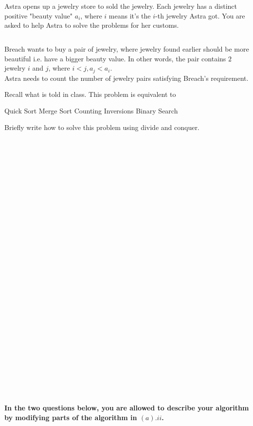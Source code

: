 
Astra opens up a jewelry store to sold the jewelry. Each jewelry has a distinct positive "beauty value" $a_i$, where $i$ means it's the $i$-th jewelry Astra got. You are asked to help Astra to solve the problems for her customs.

\begin{parts}
\part{} 

Breach wants to buy a pair of jewelry, where jewelry found earlier should be more beautiful i.e. have a bigger beauty value. In other words, the pair contains $2$ jewelry $i$ and $j$, where $i<j,a_j<a_i$. \\
Astra needs to count the number of jewelry pairs satisfying Breach's requirement.

\begin{subparts}
    \subpart[1] Recall what is told in class. This problem is equivalent to \\
    \begin{oneparcheckboxes}
        \choice Quick Sort
        \choice Merge Sort
        \choice Counting Inversions
        \choice Binary Search
    \end{oneparcheckboxes}
    \subpart[2] Briefly write how to solve this problem using divide and conquer.
\begin{solution}
\\
\\
\\
\\
\\
\\
\\
\\
\\
\\
\\
\\
\\
\\
\\
\\
\\
\\
\\
\\
\\
\\
\\
\\
\\
\\
\\
\end{solution}
\end{subparts}
\newpage
\noindent \textbf{In the two questions below, you are allowed to describe your algorithm by modifying parts of the algorithm in $(a).ii$. 
} 

\end{parts}
